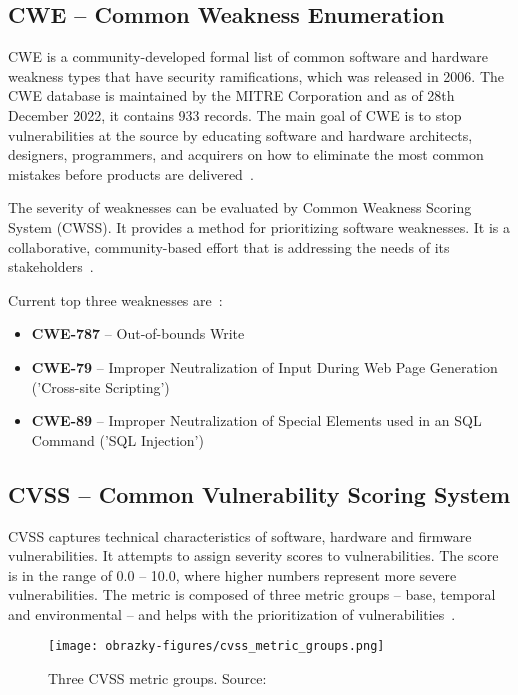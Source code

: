   \subsection*{CWE -- Common Weakness Enumeration}
    CWE is a community-developed formal list of common software and hardware weakness types that
    have security ramifications, which was released in 2006. The CWE database is maintained by the MITRE Corporation
    and as of 28th December 2022, it contains 933 records. The main goal of CWE is to stop vulnerabilities
    at the source by educating software and hardware architects, designers, programmers, and acquirers
    on how to eliminate the most common mistakes before products are delivered~\cite{CWE}.

    The severity of weaknesses can be evaluated by Common Weakness Scoring System (CWSS). It provides a method
    for prioritizing software weaknesses. It is a collaborative, community-based effort that is addressing
    the needs of its stakeholders~\cite{CWSS}.

    \noindent Current top three weaknesses are~\cite{CWEtop25}:
    \begin{itemize}
      \item \textbf{CWE-787} -- Out-of-bounds Write
      \item \textbf{CWE-79} -- Improper Neutralization of Input During Web Page Generation ('Cross-site Scripting')
      \item \textbf{CWE-89} -- Improper Neutralization of Special Elements used in an SQL Command ('SQL Injection')
    \end{itemize}

  \subsection*{CVSS -- Common Vulnerability Scoring System}
  CVSS captures technical characteristics of software, hardware and firmware vulnerabilities. It attempts
  to assign severity scores to vulnerabilities. The score is in the range of 0.0 -- 10.0, where higher numbers represent
  more severe vulnerabilities. The metric is composed of three metric groups -- base, temporal and environmental --
  and helps with the prioritization of vulnerabilities~\cite{CVSSFirst, CVSSresearchgate}.

  \begin{figure}[h]
    \centering
    \texttt{[image: obrazky-figures/cvss\_metric\_groups.png]}
    \caption{Three CVSS metric groups. Source:~\cite{CVSSFirst}}
  \end{figure}

